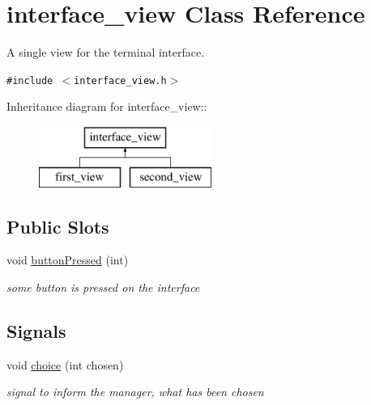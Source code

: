 \hypertarget{classinterface__view}{
\section{interface\_\-view Class Reference}
\label{classinterface__view}
}
A single view for the terminal interface.  


{\tt \#include $<$interface\_\-view.h$>$}

Inheritance diagram for interface\_\-view::\begin{figure}[H]
\begin{center}
\leavevmode
\includegraphics[height=2cm]{classinterface__view}
\end{center}
\end{figure}
\subsection*{Public Slots}
\begin{CompactItemize}
\item 
\hypertarget{classinterface__view_2cbfdb9bdf8d47fd9a381df0bc67f434}{
void \hyperlink{classinterface__view_2cbfdb9bdf8d47fd9a381df0bc67f434}{buttonPressed} (int)}
\label{classinterface__view_2cbfdb9bdf8d47fd9a381df0bc67f434}

\begin{CompactList}\small\item\em some button is pressed on the interface \item\end{CompactList}\end{CompactItemize}
\subsection*{Signals}
\begin{CompactItemize}
\item 
\hypertarget{classinterface__view_0ce60b1adae303b356ac4c1835c40ca4}{
void \hyperlink{classinterface__view_0ce60b1adae303b356ac4c1835c40ca4}{choice} (int chosen)}
\label{classinterface__view_0ce60b1adae303b356ac4c1835c40ca4}

\begin{CompactList}\small\item\em signal to inform the manager, what has been chosen \item\end{CompactList}\end{CompactItemize}
